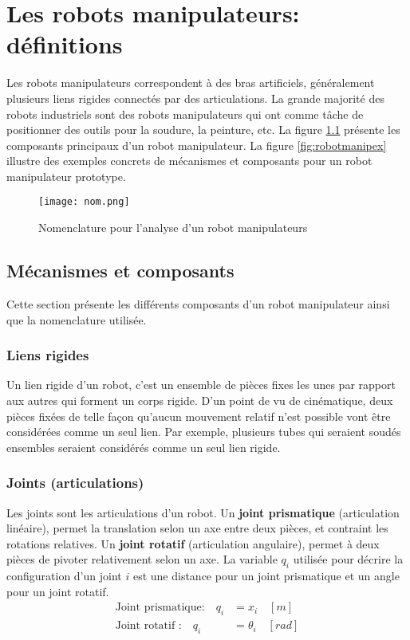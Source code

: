 \chapter{Les robots manipulateurs: définitions}
\label{sec:robotmanip}

Les robots manipulateurs correspondent à des bras artificiels, généralement plusieurs liens rigides connectés par des articulations. La grande majorité des robots industriels sont des robots manipulateurs qui ont comme tâche de positionner des outils pour la soudure, la peinture, etc. La figure \ref{fig:nom} présente les composants principaux d'un robot manipulateur. La figure \ref{fig:robotmanipex} illustre des exemples concrets de mécanismes et composants pour un robot manipulateur prototype. 

\begin{figure}[H]
	\centering
		\texttt{[image: nom.png]}
	\caption{Nomenclature pour l'analyse d'un robot manipulateurs}
	\label{fig:nom}
\end{figure}

\section{Mécanismes et composants}

Cette section présente les différents composants d'un robot manipulateur ainsi que la nomenclature utilisée. 

\subsection{Liens rigides}

Un lien rigide d'un robot, c'est un ensemble de pièces fixes les unes par rapport aux autres qui forment un corps rigide. D'un point de vu de cinématique, deux pièces fixées de telle façon qu'aucun mouvement relatif n'est possible vont être considérées comme un seul lien. Par exemple, plusieurs tubes qui seraient soudés ensembles seraient considérés comme un seul lien rigide. 

\subsection{Joints (articulations)}

Les joints sont les articulations d'un robot. Un \textbf{joint prismatique} (articulation linéaire), permet la translation selon un axe entre deux pièces, et contraint les rotations relatives. Un \textbf{joint rotatif} (articulation angulaire), permet à deux pièces de pivoter relativement selon un axe. La variable $q_i$ utilisée pour décrire la configuration d'un joint $i$ est une distance pour un joint prismatique et un angle pour un joint rotatif.
\begin{align}
\text{Joint prismatique:} \quad q_i &= x_i      \quad [m] \\
\text{Joint rotatif    :} \quad q_i &= \theta_i \quad [rad]
\end{align} 

